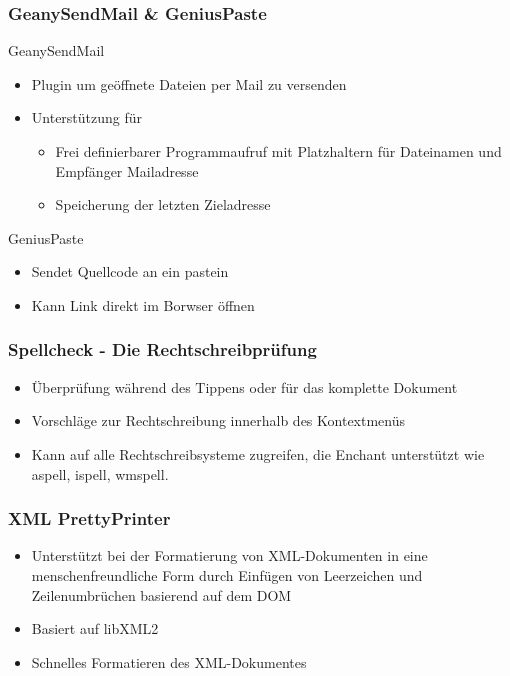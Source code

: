\begin{frame}
  \frametitle{GeanySendMail \& GeniusPaste}
  \begin{block}{GeanySendMail}
    \begin{itemize}
      \item Plugin um geöffnete Dateien per Mail zu versenden
      \item Unterstützung für
        \begin{itemize}
        \item Frei definierbarer Programmaufruf mit Platzhaltern für
          Dateinamen und Empfänger Mailadresse
        \item Speicherung der letzten Zieladresse
        \end{itemize}
    \end{itemize}
  \end{block}
  \begin{block}{GeniusPaste}
	\begin{itemize}
		\item Sendet Quellcode an ein pastein
		\item Kann Link direkt im Borwser öffnen
	\end{itemize}
  \end{block}
\end{frame}

\begin{frame}
  \frametitle{Spellcheck - Die Rechtschreibprüfung}
  \begin{block}{}
    \begin{itemize}
    \item Überprüfung während des Tippens oder für das komplette
      Dokument
    \item Vorschläge zur Rechtschreibung innerhalb des Kontextmenüs
    \item Kann auf alle Rechtschreibsysteme zugreifen, die Enchant
      unterstützt wie aspell, ispell, wmspell.
    \end{itemize}
  \end{block}
\end{frame}

\begin{frame}
    \frametitle{XML PrettyPrinter}
    \begin{block}{}
    \begin{itemize}
        \item Unterstützt bei der Formatierung von XML-Dokumenten
              in eine menschenfreundliche Form durch Einfügen von
              Leerzeichen und Zeilenumbrüchen basierend auf dem DOM
        \item Basiert auf libXML2
        \item Schnelles Formatieren des XML-Dokumentes
    \end{itemize}
    \end{block}
\end{frame}

